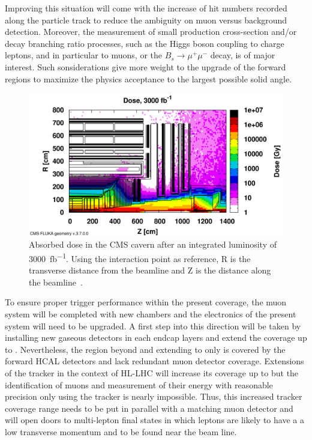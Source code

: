 	Improving this situation will come with the increase of hit numbers recorded along the particle track to reduce the ambiguity on muon versus background detection. Moreover, the measurement of small production cross-section and/or decay branching ratio processes, such as the Higgs boson coupling to charge leptons, and in particular to muons, or the $B_s \rightarrow \mu^+\mu^-$ decay, is of major interest. Such sonsiderations give more weight to the upgrade of the forward regions to maximize the physics acceptance to the largest possible solid angle.
	
\endgroup
\begingroup\setlength{\intextsep}{5pt}\setlength{\columnsep}{15pt}

	\begin{figure}
		\centering
		\vspace{25pt}
		\includegraphics[width=\linewidth]{fig/chapt3/HL-LHC-Dose.png}
		\caption{\label{fig:Dose} Absorbed dose in the CMS cavern after an integrated luminosity of \SI{3000}{fb^{-1}}. Using the interaction point as reference, R is the transverse distance from the beamline and Z is the distance along the beamline~\cite{PHASEIITP}.}
	\end{figure}
	
	To ensure proper trigger performance within the present coverage, the muon system will be completed with new chambers and the electronics of the present system will need to be upgraded. A first step into this direction will be taken by installing new gaseous detectors in each endcap layers and extend the coverage up to . Nevertheless, the region beyond  and extending to  only is covered by the forward HCAL detectors and lack redundant muon detector coverage. Extensions of the tracker in the context of HL-LHC will increase its coverage up to  but the identification of muons and measurement of their energy with reasonable precision only using the tracker is nearly impossible. Thus, this increased tracker coverage range needs to be put in parallel with a matching muon detector and will open doors to multi-lepton final states in which leptons are likely to have a a low transverse momentum and to be found near the beam line.
	
